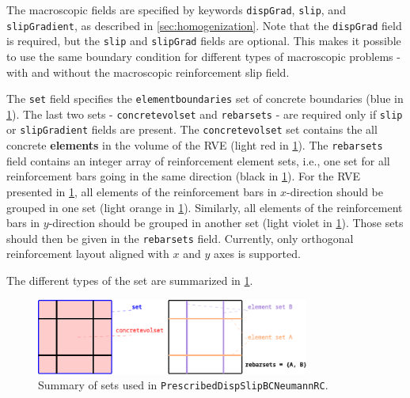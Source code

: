 \documentclass[11pt]{article}
\newcommand{\param}[1]{\texttt{#1}}
\begin{document}
The macroscopic fields are specified by keywords \param{dispGrad}, \param{slip}, and \param{slipGradient}, as described in \cref{sec:homogenization}. Note that the \param{dispGrad} field is required, but the \param{slip} and \param{slipGrad} fields are optional. This makes it possible to use the same boundary condition for different types of macroscopic problems - with and without the macroscopic reinforcement slip field.

The \param{set} field specifies the \param{elementboundaries} set of concrete boundaries (blue in \cref{fig:neumannsets}).
The last two sets - \param{concretevolset} and \param{rebarsets} - are required only if \param{slip} or \param{slipGradient} fields are present. 
The \param{concretevolset} set contains the all concrete \textbf{elements} in the volume of the RVE (light red in \cref{fig:neumannsets}).
The \param{rebarsets} field contains an integer array of reinforcement element sets, i.e., one set for all reinforcement bars going in the same direction (black in \cref{fig:neumannsets}).
For the RVE presented in \cref{fig:neumannsets}, all elements of the reinforcement bars in $x$-direction should be grouped in one set (light orange in \cref{fig:neumannsets}). Similarly, all elements of the reinforcement bars in $y$-direction should be grouped in another set (light violet in \cref{fig:neumannsets}). 
Those sets should then be given in the \param{rebarsets} field.
Currently, only orthogonal reinforcement layout aligned with $x$ and $y$ axes is supported.

The different types of the set are summarized in \cref{fig:neumannsets}.

\begin{figure}[H]
    \centering
    \includegraphics[width=0.8\textwidth]{img/neumannsets.pdf}
    \caption{Summary of sets used in \param{PrescribedDispSlipBCNeumannRC}.}
    \label{fig:neumannsets}
\end{figure}
\end{document}
